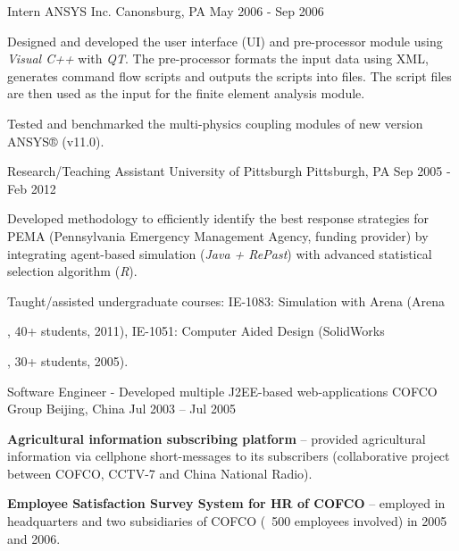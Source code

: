 \begin{cventries}
\cventry
{Intern}          %
{ANSYS Inc.}             %
{Canonsburg, PA}                       %
{May 2006 - Sep 2006}                  %
{
    \begin{cvitems}                          
        \item {
Designed and developed the user interface (UI) and pre-processor module using \textit{Visual C++} with \textit{QT}. The pre-processor formats the input data using XML, generates command flow scripts and outputs the scripts into files. The script files are then used as the input for the finite element analysis module.
		}
        \item {
Tested and benchmarked the multi-physics coupling modules of new version ANSYS® (v11.0).
		}        
    \end{cvitems}%
}

\cventry
{Research/Teaching Assistant}          %
{University of Pittsburgh}             %
{Pittsburgh, PA}                       %
{Sep 2005 - Feb 2012}                  %
{
    \begin{cvitems}                          
        \item {
Developed methodology to efficiently identify the best response strategies for PEMA (Pennsylvania Emergency Management Agency, funding provider) by integrating agent-based simulation (\textit{Java + RePast}) with advanced statistical selection algorithm (\textit{R}).
		}
        \item {
Taught/assisted undergraduate courses: IE-1083: Simulation with Arena (Arena\markright, 40+ students, 2011), IE-1051: Computer Aided Design (SolidWorks\markright, 30+ students, 2005).
		}        
    \end{cvitems}%
}

\cventry
{Software Engineer - Developed multiple J2EE-based web-applications}                   %
{COFCO Group}                         %
{Beijing, China}                      %
{Jul 2003 -- Jul 2005}                %
{
    \begin{cvitems}                          
        \item {
\textbf{Agricultural information subscribing platform} -- provided agricultural information via cellphone short-messages to its subscribers (collaborative project between COFCO, CCTV-7 and China National Radio).
		}          
        \item {
\textbf{Employee Satisfaction Survey System for HR of COFCO} -- employed in headquarters and two subsidiaries of COFCO (~500 employees involved) in 2005 and 2006. %
		}        
    \end{cvitems}  %
}
\end{cventries}
